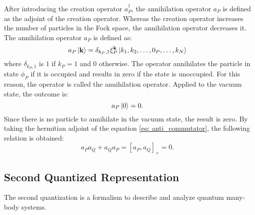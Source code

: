 After introducing the creation operator $a_P^{\dagger}$, the annihilation operator $a_P$ is defined as the adjoint of the creation operator. Whereas the creation operator increases the number of particles in the Fock space, the annihilation operator decreases it. 
The annihilation operator $a_P$ is defined as:
\begin{equation}
    a_P \ket{\mathbf{k}} = \delta_{k_P, 1} \xi_P^{\mathbf{k}} \ket{k_1, k_2, \ldots, 0_P, \ldots, k_N}
\end{equation}
where $\delta_{k_P, 1}$ is $1$ if $k_P = 1$ and $0$ otherwise. The operator annihilates the particle in state $\phi_P$ if it is occupied and results in zero if the state is unoccupied. For this reason, the operator is called the annihilation operator. 
Applied to the vacuum state, the outcome is:
\begin{equation}
    a_P \ket{0} = 0.
\end{equation}
Since there is no particle to annihilate in the vacuum state, the result is zero.
By taking the hermitian adjoint of the equation \eqref{eq: anti_commutator}, the following relation is obtained:
\begin{equation}
    a_P a_Q + a_Q a_P = \left [ a_P, a_Q \right ]_+ = 0.
\end{equation}



\subsection{Second Quantized Representation}




The second quantization is a formalism to describe and analyze quantum many-body systems. \cite{Altland}